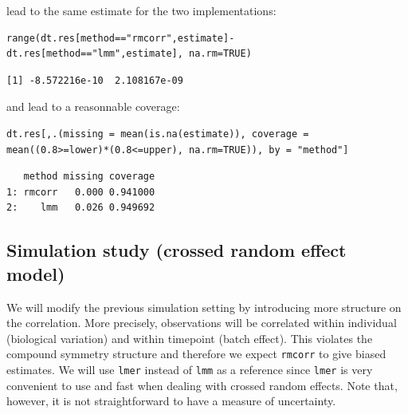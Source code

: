 \documentclass[12pt]{article}
\begin{document}
lead to the same estimate for the two implementations:
\lstset{language=r,label= ,caption= ,captionpos=b,numbers=none}
\begin{lstlisting}
range(dt.res[method=="rmcorr",estimate]-dt.res[method=="lmm",estimate], na.rm=TRUE)
\end{lstlisting}

\begin{verbatim}
[1] -8.572216e-10  2.108167e-09
\end{verbatim}


and lead to a reasonnable coverage:
\lstset{language=r,label= ,caption= ,captionpos=b,numbers=none}
\begin{lstlisting}
dt.res[,.(missing = mean(is.na(estimate)), coverage = mean((0.8>=lower)*(0.8<=upper), na.rm=TRUE)), by = "method"]
\end{lstlisting}

\begin{verbatim}
   method missing coverage
1: rmcorr   0.000 0.941000
2:    lmm   0.026 0.949692
\end{verbatim}

\subsection{Simulation study (crossed random effect model)}
\label{sec:orgad5e3e9}

We will modify the previous simulation setting by introducing more
structure on the correlation. More precisely, observations will be
correlated within individual (biological variation) and within
timepoint (batch effect). This violates the compound symmetry
structure and therefore we expect \texttt{rmcorr} to give biased
estimates. We will use \texttt{lmer} instead of \texttt{lmm} as a reference since
\texttt{lmer} is very convenient to use and fast when dealing with crossed
random effects. Note that, however, it is not straightforward to have a
measure of uncertainty.
\end{document}
